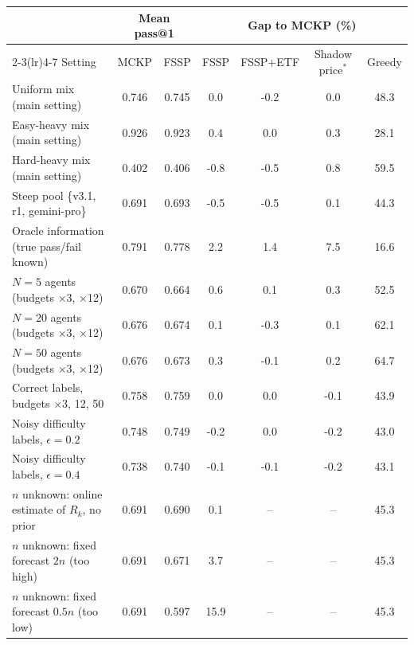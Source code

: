 \begin{tabular}{lcccccc}
\toprule
 & \multicolumn{2}{c}{Mean pass@1} & \multicolumn{4}{c}{Gap to MCKP (\%)} \\
\cmidrule(lr){2-3}\cmidrule(lr){4-7}
Setting & MCKP & FSSP & FSSP & FSSP+ETF & Shadow price$^*$ & Greedy \\
\midrule
Uniform mix (main setting) & 0.746 & 0.745 & 0.0 & -0.2 & 0.0 & 48.3 \\
Easy-heavy mix (main setting) & 0.926 & 0.923 & 0.4 & 0.0 & 0.3 & 28.1 \\
Hard-heavy mix (main setting) & 0.402 & 0.406 & -0.8 & -0.5 & 0.8 & 59.5 \\
\midrule
Steep pool \{v3.1, r1, gemini-pro\} & 0.691 & 0.693 & -0.5 & -0.5 & 0.1 & 44.3 \\
Oracle information (true pass/fail known) & 0.791 & 0.778 & 2.2 & 1.4 & 7.5 & 16.6 \\
\midrule
$N=5$ agents (budgets $\times$3, $\times$12) & 0.670 & 0.664 & 0.6 & 0.1 & 0.3 & 52.5 \\
$N=20$ agents (budgets $\times$3, $\times$12) & 0.676 & 0.674 & 0.1 & -0.3 & 0.1 & 62.1 \\
$N=50$ agents (budgets $\times$3, $\times$12) & 0.676 & 0.673 & 0.3 & -0.1 & 0.2 & 64.7 \\
\midrule
Correct labels, budgets $\times$3, 12, 50 & 0.758 & 0.759 & 0.0 & 0.0 & -0.1 & 43.9 \\
Noisy difficulty labels, $\epsilon=0.2$ & 0.748 & 0.749 & -0.2 & 0.0 & -0.2 & 43.0 \\
Noisy difficulty labels, $\epsilon=0.4$ & 0.738 & 0.740 & -0.1 & -0.1 & -0.2 & 43.1 \\
\midrule
$n$ unknown: online estimate of $R_k$, no prior & 0.691 & 0.690 & 0.1 & -- & -- & 45.3 \\
$n$ unknown: fixed forecast $2n$ (too high) & 0.691 & 0.671 & 3.7 & -- & -- & 45.3 \\
$n$ unknown: fixed forecast $0.5n$ (too low) & 0.691 & 0.597 & 15.9 & -- & -- & 45.3 \\
\bottomrule
\end{tabular}